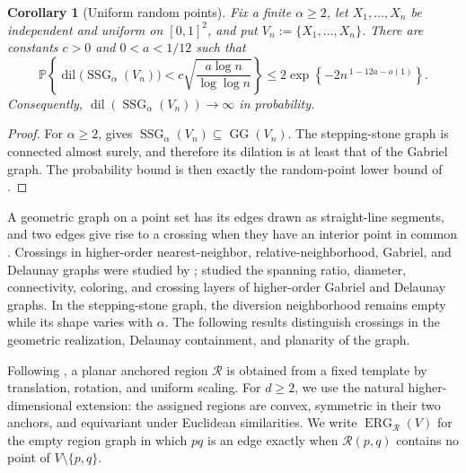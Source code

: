\documentclass[a4paper,fleqn]{cas-sc}
\newtheorem{corollary}{Corollary}
\theoremstyle{definition}
\theoremstyle{remark}
\newcommand{\Pp}{\mathds{P}}
\newcommand{\0}{\mathbf{0}}
\DeclareMathOperator{\SSG}{SSG}
\DeclareMathOperator{\GG}{GG}
\begin{document}
\begin{corollary}[Uniform random points]
\label{cor:random-dilation}
Fix a finite $\alpha\geq2$, let
$X_1,\ldots,X_n$ be independent and uniform on $[0,1]^2$, and put
$V_n:=\{X_1,\ldots,X_n\}$.  There are constants $c>0$ and
$0<a<1/12$ such that
\begin{equation}
\Pp\!\left\{
  \operatorname{dil}\bigl(\SSG_\alpha(V_n)\bigr)
  <c\sqrt{\frac{a\log n}{\log\log n}}
\right\}
\leq
2\exp\!\left\{-2n^{\,1-12a-o(1)}\right\}.
\end{equation}
Consequently,
$\operatorname{dil}(\SSG_\alpha(V_n))\to\infty$ in probability.
\end{corollary}

\begin{proof}
For $\alpha\geq2$,  gives
$\SSG_\alpha(V_n)\subseteq\GG(V_n)$.  The stepping-stone graph is
connected almost surely, and therefore its dilation is at least that of
the Gabriel graph.  The probability bound is then exactly the random-point
lower bound of \citet[Theorem~5.1]{bose2006spanning}.
\end{proof}

\clearpage

A geometric graph on a point set has its edges drawn as straight-line
segments, and two edges give rise to a crossing when they have an interior
point in common \citep{abrego2011crossing}.  Crossings in higher-order
nearest-neighbor, relative-neighborhood, Gabriel, and Delaunay graphs were
studied by \citet{abrego2011crossing}; \citet{bose2013properties} studied
the spanning ratio, diameter, connectivity, coloring, and crossing layers
of higher-order Gabriel and Delaunay graphs.  In the stepping-stone graph,
the diversion neighborhood remains empty while its shape varies with
$\alpha$.  The following results distinguish crossings in the geometric
realization, Delaunay containment, and planarity of the graph.

Following \citet[Sec.~2]{cardinal2009empty}, a planar anchored region
$\mathcal R$ is obtained from a fixed template by translation, rotation,
and uniform scaling. For $d\geq2$, we use the natural higher-dimensional
extension: the assigned regions are convex, symmetric in their two anchors,
and equivariant under Euclidean similarities. We write
$\operatorname{ERG}_{\mathcal R}(V)$ for the empty region graph in which
$pq$ is an edge exactly when $\mathcal R(p,q)$ contains no point of
$V\setminus\{p,q\}$.
\end{document}

